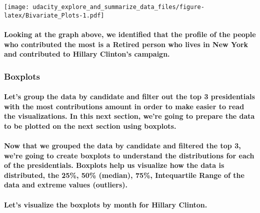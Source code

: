 \documentclass[]{article}
\let\oldparagraph\paragraph
\renewcommand{\paragraph}[1]{\oldparagraph{#1}\mbox{}}
\begin{document}
\texttt{[image: udacity\_explore\_and\_summarize\_data\_files/figure-latex/Bivariate\_Plots-1.pdf]}

\paragraph{Looking at the graph above, we identified that the profile of
the people who contributed the most is a Retired person who lives in New
York and contributed to Hillary Clinton's
campaign.}\label{looking-at-the-graph-above-we-identified-that-the-profile-of-the-people-who-contributed-the-most-is-a-retired-person-who-lives-in-new-york-and-contributed-to-hillary-clintons-campaign.}

\subsubsection{Boxplots}\label{boxplots}

\paragraph{Let's group the data by candidate and filter out the top 3
presidentials with the most contributions amount in order to make easier
to read the visualizations. In this next section, we're going to prepare
the data to be plotted on the next section using
boxplots.}\label{lets-group-the-data-by-candidate-and-filter-out-the-top-3-presidentials-with-the-most-contributions-amount-in-order-to-make-easier-to-read-the-visualizations.-in-this-next-section-were-going-to-prepare-the-data-to-be-plotted-on-the-next-section-using-boxplots.}

\paragraph{Now that we grouped the data by candidate and filtered the
top 3, we're going to create boxplots to understand the distributions
for each of the presidentials. Boxplots help us visualize how the data
is distributed, the 25\%, 50\% (median), 75\%, Intequartile Range of the
data and extreme values
(outliers).}\label{now-that-we-grouped-the-data-by-candidate-and-filtered-the-top-3-were-going-to-create-boxplots-to-understand-the-distributions-for-each-of-the-presidentials.-boxplots-help-us-visualize-how-the-data-is-distributed-the-25-50-median-75-intequartile-range-of-the-data-and-extreme-values-outliers.}

\paragraph{Let's visualize the boxplots by month for Hillary
Clinton.}\label{lets-visualize-the-boxplots-by-month-for-hillary-clinton.}
\end{document}
